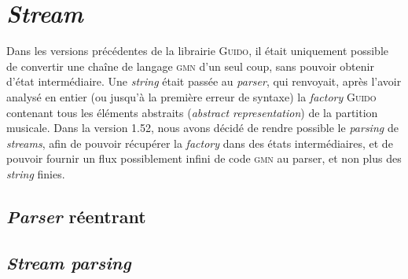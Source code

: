 \documentclass{article}
\newcommand{\guido}			{\textsc{Guido}}
\newcommand{\gmn}			{\textsc{gmn}}
\begin{document}
\section{\emph{Stream}}\label{sec:stream}

Dans les versions précédentes de la librairie \guido{}, il était uniquement possible de convertir une chaîne de langage \gmn{} d'un seul coup, sans pouvoir obtenir d'état intermédiaire. Une \emph{string} était passée au \emph{parser}, qui renvoyait, après l'avoir analysé en entier (ou jusqu'à la première erreur de syntaxe) la \emph{factory} \guido{} contenant tous les éléments abstraits (\emph{abstract representation}) de la partition musicale. Dans la version 1.52, nous avons décidé de rendre possible le \emph{parsing} de \emph{streams}, afin de pouvoir récupérer la \emph{factory} dans des états intermédiaires, et de pouvoir fournir un flux possiblement infini de code \gmn{} au parser, et non plus des \emph{string} finies.

\subsection{\emph{Parser} réentrant}\label{subsec:parserReentrant}


\subsection{\emph{Stream parsing}}\label{subsec:streamParsing}
\end{document}
